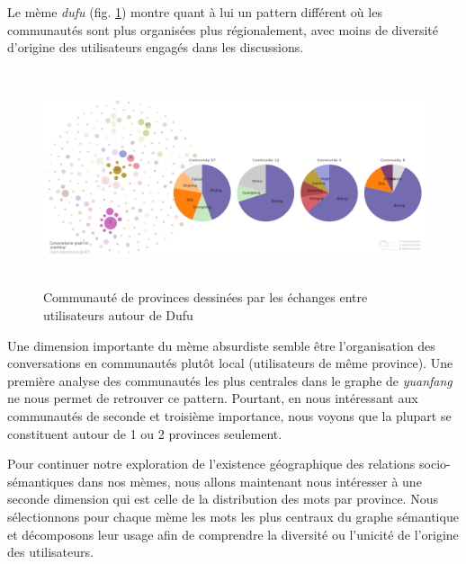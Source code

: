 Le m\`eme \textit{dufu} (fig. \ref{fig:dufu-users-pie}) montre quant \`a lui un pattern diff\'erent
o\`u les communaut\'es sont plus organis\'ees plus r\'egionalement,
avec moins de diversit\'e d{\textquoteright}origine des utilisateurs
engag\'es dans les discussions.


\begin{figure}
    \centering
    \includegraphics[width=5.9996in,height=2.5004in]{figures/chap4/chapitre4-img58.png}
    \caption{
        Communaut\'e de provinces dessin\'ees par les \'echanges entre utilisateurs autour de Dufu
    }
    \label{fig:dufu-users-pie}
\end{figure}



Une dimension importante du m\`eme absurdiste semble \^etre l{\textquoteright}organisation des conversations en communaut\'es plut\^ot local (utilisateurs de m\^eme province). Une premi\`ere analyse des communaut\'es les plus centrales dans le graphe de \textit{yuanfang} ne nous permet de retrouver ce pattern. Pourtant, en nous int\'eressant aux communaut\'es de seconde et troisi\`eme importance, nous voyons que la plupart se constituent autour de 1 ou 2 provinces seulement.  

Pour continuer notre exploration de l{\textquoteright}existence g\'eographique des relations socio-s\'emantiques dans nos m\`emes, nous allons maintenant nous int\'eresser \`a une seconde dimension qui est celle de la distribution des mots par province. Nous s\'electionnons pour chaque m\`eme les mots les plus centraux du graphe s\'emantique et d\'ecomposons leur usage afin de comprendre la diversit\'e ou l{\textquoteright}unicit\'e de l{\textquoteright}origine des utilisateurs. 

